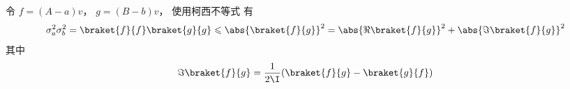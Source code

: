 

令 $f = (A-a)v$， $g = (B-b)v$， 使用柯西不等式 有
\begin{equation}
\sigma_a^2 \sigma_b^2 = \braket{f}{f} \braket{g}{g} \leqslant \abs{\braket{f}{g}}^2 = \abs{\Re\braket{f}{g}}^2 + \abs{\Im\braket{f}{g}}^2
\end{equation}
其中
\begin{equation}
\Im\braket{f}{g} = \frac{1}{2\I}(\braket{f}{g} - \braket{g}{f})
\end{equation}

